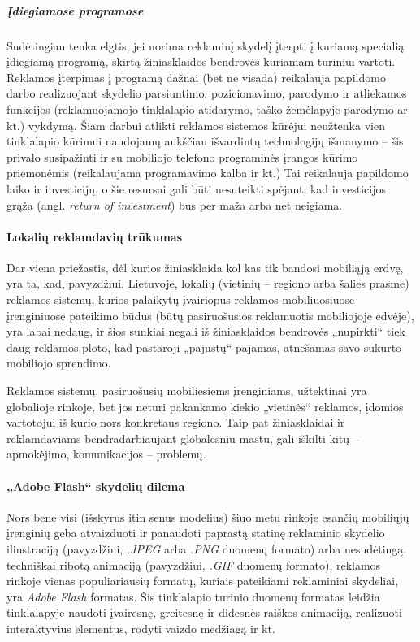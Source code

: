 \documentclass[kursinis-darbas]{vukf}
\begin{document}
\subparagraph{Įdiegiamose programose}

Sudėtingiau tenka elgtis, jei norima reklaminį skydelį įterpti į kuriamą specialią įdiegiamą programą, skirtą žiniasklaidos bendrovės kuriamam turiniui vartoti. Reklamos įterpimas į programą dažnai (bet ne visada) reikalauja papildomo darbo realizuojant skydelio parsiuntimo, pozicionavimo, parodymo ir atliekamos funkcijos (reklamuojamojo tinklalapio atidarymo, taško žemėlapyje parodymo ar kt.) vykdymą. Šiam darbui atlikti reklamos sistemos kūrėjui neužtenka vien tinklalapio kūrimui naudojamų aukščiau išvardintų technologijų išmanymo – šis privalo susipažinti ir su mobiliojo telefono programinės įrangos kūrimo priemonėmis (reikalaujama programavimo kalba ir kt.) Tai reikalauja papildomo laiko ir investicijų, o šie resursai gali būti nesuteikti spėjant, kad investicijos grąža (angl. \emph{return of investment}) bus per maža arba net neigiama.

\paragraph{Lokalių reklamdavių trūkumas}

Dar viena priežastis, dėl kurios žiniasklaida kol kas tik bandosi mobiliąją erdvę, yra ta, kad, pavyzdžiui, Lietuvoje, lokalių (vietinių – regiono arba šalies prasme) reklamos sistemų, kurios palaikytų įvairiopus reklamos mobiliuosiuose įrenginiuose pateikimo būdus (būtų pasiruošusios reklamuotis mobiliojoje edvėje), yra labai nedaug, ir šios sunkiai negali iš žiniasklaidos bendrovės „nupirkti“ tiek daug reklamos ploto, kad pastaroji „pajustų“ pajamas, atnešamas savo sukurto mobiliojo sprendimo.

Reklamos sistemų, pasiruošusių mobiliesiems įrenginiams, užtektinai yra globalioje rinkoje, bet jos neturi pakankamo kiekio „vietinės“ reklamos, įdomios vartotojui iš kurio nors konkretaus regiono. Taip pat žiniasklaidai ir reklamdaviams bendradarbiaujant globalesniu mastu, gali iškilti kitų – apmokėjimo, komunikacijos – problemų.

\paragraph{„Adobe Flash“ skydelių dilema}

Nors bene visi (išskyrus itin senus modelius) šiuo metu rinkoje esančių mobiliųjų įrenginių geba atvaizduoti ir panaudoti paprastą statinę reklaminio skydelio iliustraciją (pavyzdžiui, \emph{.JPEG} arba \emph{.PNG} duomenų formato) arba nesudėtingą, techniškai ribotą animaciją (pavyzdžiui, \emph{.GIF} duomenų formato), reklamos rinkoje vienas populiariausių formatų, kuriais pateikiami reklaminiai skydeliai, yra \emph{Adobe Flash} formatas. Šis tinklalapio turinio duomenų formatas leidžia tinklalapyje naudoti įvairesnę, greitesnę ir didesnės raiškos animaciją, realizuoti interaktyvius elementus, rodyti vaizdo medžiagą ir kt. \cite{adobe_what_is_flash_professional}
\end{document}

